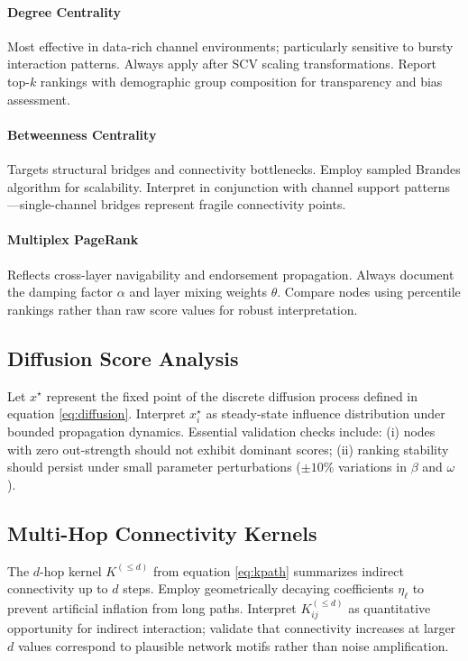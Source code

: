 \documentclass[12pt]{article}
\theoremstyle{plain}
\begin{document}
\paragraph{Degree Centrality}
Most effective in data-rich channel environments; particularly sensitive to bursty interaction patterns. Always apply after SCV scaling transformations. Report top-$k$ rankings with demographic group composition for transparency and bias assessment.

\paragraph{Betweenness Centrality}
Targets structural bridges and connectivity bottlenecks. Employ sampled Brandes algorithm for scalability. Interpret in conjunction with channel support patterns—single-channel bridges represent fragile connectivity points.

\paragraph{Multiplex PageRank}
Reflects cross-layer navigability and endorsement propagation. Always document the damping factor $\alpha$ and layer mixing weights $\theta$. Compare nodes using percentile rankings rather than raw score values for robust interpretation.

\subsection{Diffusion Score Analysis}
Let $x^\star$ represent the fixed point of the discrete diffusion process defined in equation \eqref{eq:diffusion}. Interpret $x^\star_i$ as steady-state influence distribution under bounded propagation dynamics. Essential validation checks include: (i) nodes with zero out-strength should not exhibit dominant scores; (ii) ranking stability should persist under small parameter perturbations ($\pm 10\%$ variations in $\beta$ and $\omega$).

\subsection{Multi-Hop Connectivity Kernels}
The $d$-hop kernel $K^{(\le d)}$ from equation \eqref{eq:kpath} summarizes indirect connectivity up to $d$ steps. Employ geometrically decaying coefficients $\eta_\ell$ to prevent artificial inflation from long paths. Interpret $K^{(\le d)}_{ij}$ as quantitative opportunity for indirect interaction; validate that connectivity increases at larger $d$ values correspond to plausible network motifs rather than noise amplification.
\end{document}
